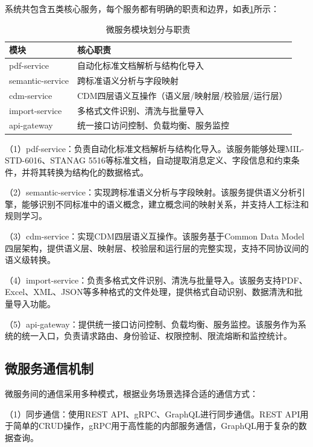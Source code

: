 系统共包含五类核心服务，每个服务都有明确的职责和边界，如表\ref{table:microservices}所示：

\begin{table}[H]
    \caption{微服务模块划分与职责}
    \label{table:microservices}
    \centering
    \begin{tabular}{|l|l|}
        \hline
        \textbf{模块} & \textbf{核心职责} \\
        \hline
        pdf-service & 自动化标准文档解析与结构化导入 \\
        semantic-service & 跨标准语义分析与字段映射 \\
        cdm-service & CDM四层语义互操作（语义层/映射层/校验层/运行层） \\
        import-service & 多格式文件识别、清洗与批量导入 \\
        api-gateway & 统一接口访问控制、负载均衡、服务监控 \\
        \hline
    \end{tabular}
\end{table}

（1）pdf-service：负责自动化标准文档解析与结构化导入。该服务能够处理MIL-STD-6016、STANAG 5516等标准文档，自动提取消息定义、字段信息和约束条件，并将其转换为结构化的数据格式。

（2）semantic-service：实现跨标准语义分析与字段映射。该服务提供语义分析引擎，能够识别不同标准中的语义概念，建立概念间的映射关系，并支持人工标注和规则学习。

（3）cdm-service：实现CDM四层语义互操作。该服务基于Common Data Model四层架构，提供语义层、映射层、校验层和运行层的完整实现，支持不同协议间的语义级转换。

（4）import-service：负责多格式文件识别、清洗与批量导入。该服务支持PDF、Excel、XML、JSON等多种格式的文件处理，提供格式自动识别、数据清洗和批量导入功能。

（5）api-gateway：提供统一接口访问控制、负载均衡、服务监控。该服务作为系统的统一入口，负责请求路由、身份验证、权限控制、限流熔断和监控统计。

\subsection{微服务通信机制}

微服务间的通信采用多种模式，根据业务场景选择合适的通信方式：

（1）同步通信：使用REST API、gRPC、GraphQL进行同步通信。REST API用于简单的CRUD操作，gRPC用于高性能的内部服务通信，GraphQL用于复杂的数据查询。

